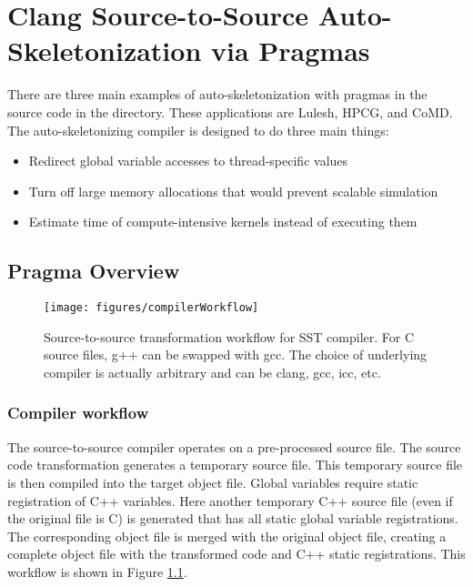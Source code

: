 
\chapter{Clang Source-to-Source Auto-Skeletonization via Pragmas}
\label{clangTutorial}

There are three main examples of auto-skeletonization with pragmas in the \sstmacro source code in the  directory.
These applications are Lulesh, HPCG, and CoMD.
The auto-skeletonizing compiler is designed to do three main things:

\begin{itemize}
\item Redirect global variable accesses to thread-specific values
\item Turn off large memory allocations that would prevent scalable simulation
\item Estimate time of compute-intensive kernels instead of executing them
\end{itemize}

\section{Pragma Overview}

\begin{figure}[h!]
\centering
\texttt{[image: figures/compilerWorkflow]}
\caption{Source-to-source transformation workflow for SST compiler. For C source files, g++ can be swapped with gcc. The choice of underlying compiler is actually arbitrary and can be clang, gcc, icc, etc.}
\label{fig:compilerWorkflow}
\end{figure}

\subsection{Compiler workflow}
The source-to-source compiler operates on a pre-processed source file.
The source code transformation generates a temporary source file.
This temporary source file is then compiled into the target object file.
Global variables require static registration of C++ variables.
Here another temporary C++ source file (even if the original file is C)
is generated that has all static global variable registrations.
The corresponding object file is merged with the original object file,
creating a complete \sstmacro object file with the transformed code and C++ static registrations.
This workflow is shown in Figure \ref{fig:compilerWorkflow}.

